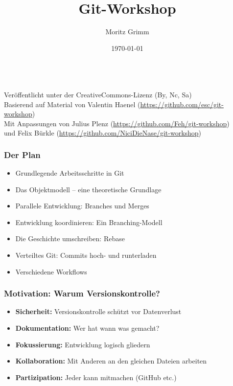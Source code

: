\documentclass{beamer}
\date{\today}
\begin{document}

\begin{frame}
		\title{Git-Workshop}
		\author{Moritz Grimm}
		\date{}
		\titlepage
		\begin{center}
			\\
			\vspace{0.4cm}
			\tiny{Veröffentlicht unter der CreativeCommons-Lizenz (By, Nc, Sa)}\\
			\vspace{0.2cm}
			\tiny{Basierend auf Material von Valentin Haenel (\url{https://github.com/esc/git-workshop})}\\
			\vspace{0.2cm}
			\tiny{Mit Anpassungen von Julius Plenz (\url{https://github.com/Feh/git-workshop})}\\
			\vspace{0.2cm}
			\tiny{und Felix Bürkle (\url{https://github.com/NiciDieNase/git-workshop})}
		\end{center}
\end{frame}
\begin{frame}
\frametitle{Der Plan}

\begin{itemize}
	\item Grundlegende Arbeitsschritte in Git
	\item Das Objektmodell -- eine theoretische Grundlage
	\item Parallele Entwicklung: Branches und Merges
	\item Entwicklung koordinieren: Ein Branching-Modell
	\item Die Geschichte umschreiben: Rebase
	\item Verteiltes Git: Commits hoch- und runterladen
	\item Verschiedene Workflows
\end{itemize}

\end{frame}
\begin{frame}
\frametitle{Motivation: Warum Versionskontrolle?}

\begin{itemize}
	\item \textbf{Sicherheit:} Versionskontrolle schützt vor Datenverlust
	\item \textbf{Dokumentation:} Wer hat wann was gemacht?
	\item \textbf{Fokussierung:} Entwicklung logisch gliedern
	\item \textbf{Kollaboration:} Mit Anderen an den gleichen Dateien arbeiten
	\item \textbf{Partizipation:} Jeder kann mitmachen (GitHub etc.)
\end{itemize}

\end{frame}
\end{document}
